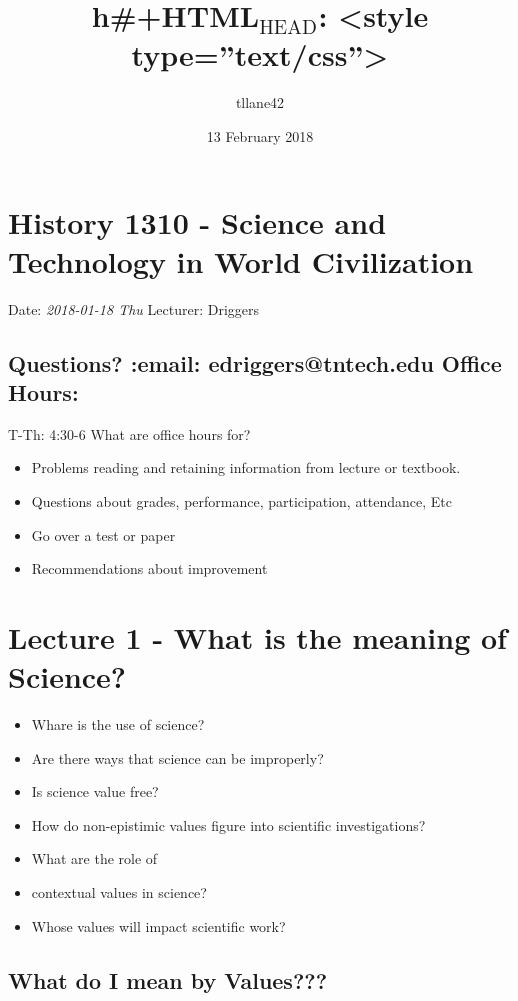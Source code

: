 \documentclass[11pt]{article}
\title{h\#+HTML$_{\mathrm{HEAD}}$: <style type=''text/css''>}
\author{tllane42}
\date{13 February 2018}
\begin{document}
\maketitle

\setcounter{tocdepth}{3}
\tableofcontents
\vspace*{1cm}


\section{History 1310 - Science and Technology in World Civilization}
\label{sec-1}
\label{history-1310---science-and-technology-in-world-civilization}


  Date: \textit{2018-01-18 Thu} Lecturer: Driggers

\subsection{Questions? \textbf{:email:} edriggers@tntech.edu \textbf{Office Hours}:}
\label{sec-1.1}

T-Th: 4:30-6
What are office hours for? 
\begin{itemize}
\item Problems reading and retaining information from lecture or textbook.
\item Questions about grades, performance, participation, attendance, Etc
\item Go over a test or paper
\item Recommendations about improvement
\end{itemize}
\section{Lecture 1 - What is the meaning of Science?}
\label{sec-2}


\begin{itemize}
\item Whare is the use of science?
\item Are there ways that science can be improperly?
\item Is science value free?
\item How do non-epistimic values figure into scientific investigations?
\item What are the role of
\item contextual values in science?
\item Whose values will impact scientific work?
\end{itemize}
\subsection{What do I mean by Values???}
\label{sec-2.1}
\end{document}
